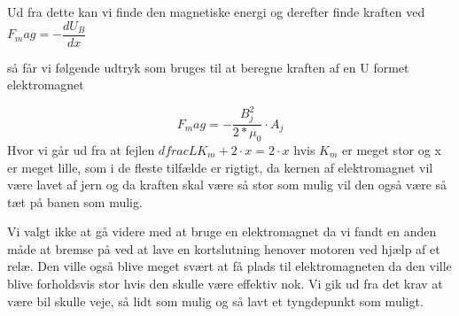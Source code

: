 Ud fra dette kan vi finde den magnetiske energi og derefter finde kraften ved $F_mag = -\dfrac{dU_B}{dx}$

så får vi følgende udtryk som bruges til at beregne kraften af en U formet elektromagnet

\begin{equation}
F_mag = - \dfrac{B_j^2}{2*\mu_0} \cdot A_j
\end{equation}
Hvor vi går ud fra at fejlen $dfrac{L}{K_m}+2 \cdot x = 2 \cdot x$ hvis $K_m$ er meget stor og x er meget lille, som i de fleste tilfælde er rigtigt, da kernen af elektromagnet vil være lavet af jern og da kraften skal være så stor som mulig vil den også være så tæt på banen som mulig.

Vi valgt ikke at gå videre med at bruge en elektromagnet da vi fandt en anden måde at bremse på ved at lave en kortslutning henover motoren ved hjælp af et relæ. Den ville også blive meget svært at få plads til elektromagneten da den ville blive forholdsvis stor hvis den skulle være effektiv nok. Vi gik ud fra det krav at være bil skulle veje, så lidt som mulig og så lavt et tyngdepunkt som muligt. 

